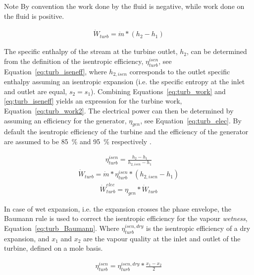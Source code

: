         \begin{notes}{Note}
            By convention the work done by the fluid is negative, while work done on the fluid is positive.
        \end{notes}
    
        \begin{align} 
            \Dot{W}_{turb} = \Dot{m} * (h_2-h_1) \label{eq:turb_work}
        \end{align}

        The specific enthalpy of the stream at the turbine outlet, \(h_2\), can be determined from the definition of the isentropic efficiency, \(\eta_{turb}^{isen}\), see Equation~\eqref{eq:turb_iseneff}, where \(h_{2, isen}\) corresponds to the outlet specific enthalpy assuming an isentropic expansion (i.e. the specific entropy at the inlet and outlet are equal, \(s_{2}=s_{1}\)). Combining Equations~\ref{eq:turb_work} and \ref{eq:turb_iseneff} yields an expression for the turbine work, Equation~\ref{eq:turb_work2}. The electrical power can then be determined by assuming an efficiency for the generator, \(\eta_{gen}\), see Equation~\ref{eq:turb_elec}. By default the isentropic efficiency of the turbine and the efficiency of the generator are assumed to be \qty{85}{\percent} and \qty{95}{\percent} respectively \cite{DiPippo2016}.

        \begin{align} 
            \eta_{turb}^{isen} = \frac{h_{2} - h_{1}}{h_{2, isen} - h_{1}} \label{eq:turb_iseneff}
        \end{align}
        \begin{align} 
            \Dot{W}_{turb} = \Dot{m} * \eta_{turb}^{isen} * (h_{2, isen} - h_{1}) \label{eq:turb_work2}
        \end{align}
        \begin{align} 
            \Dot{W}_{turb}^{elec} =\eta_{gen}*\Dot{W}_{turb} \label{eq:turb_elec}
        \end{align}

        In case of wet expansion, i.e. the expansion crosses the phase envelope, the Baumann rule is used to correct the isentropic efficiency for the vapour \emph{wetness}, Equation~\ref{eq:turb_Baumann}. Where \(\eta_{turb}^{isen, dry}\) is the isentropic efficiency of a dry expansion, and \(x_1\) and \(x_2\) are the vapour quality at the inlet and outlet of the turbine, defined on a mole basis.
        
        \begin{align} 
            \eta_{turb}^{isen} = \eta_{turb}^{isen, dry}*\frac{x_1 - x_2}{2} \label{eq:turb_Baumann}
        \end{align}

